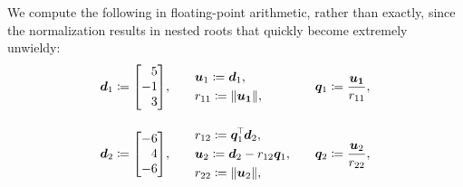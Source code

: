 \documentclass[11pt]{article}
\begin{document}
\begin{enumerate}
          We compute the following in floating-point arithmetic, rather than exactly, since the
          normalization results in nested roots that quickly become extremely unwieldy:
          \[
              \begin{alignedat}{3}
                   &
                  \vect{d}_1
                  \coloneq
                  \begin{bmatrix*}[r]
                      5 \\ -1 \\ 3
                  \end{bmatrix*}
                  \! ,
                  \qquad
                   &   &
                  \begin{aligned}{}
                       &
                      \vect{u}_1
                      \coloneq
                      \vect{d}_1,
                      \\
                       &
                      r_{11} \coloneq \norm{\vect{u_1}},
                  \end{aligned}
                   &   &
                  \vect{q}_1
                  \coloneq
                  \frac{\vect{u_1}}{r_{11}}
                  ,
                  \\[1em]
                   &
                  \vect{d}_2
                  \coloneq
                  \begin{bmatrix*}[r]
                      -6 \\ 4 \\ -6
                  \end{bmatrix*}
                  \! ,
                  \qquad
                   &   &
                  \begin{aligned}
                       &
                      r_{12} \coloneq \vect{q}_1^{\T} \vect{d}_2,
                      \\
                       &
                      \vect{u}_2
                      \coloneq
                      \vect{d}_2
                      - r_{12} \vect{q}_1,
                      \\
                       &
                      r_{22} \coloneq \norm{\vect{u}_2},
                  \end{aligned}
                  \qquad
                   &   &
                  \vect{q}_2
                  \coloneq
                  \frac{\vect{u}_2}{r_{22}}
                  ,
                  \\[1em]
                   &

\end{alignedat}\]
\end{enumerate}
\end{document}

